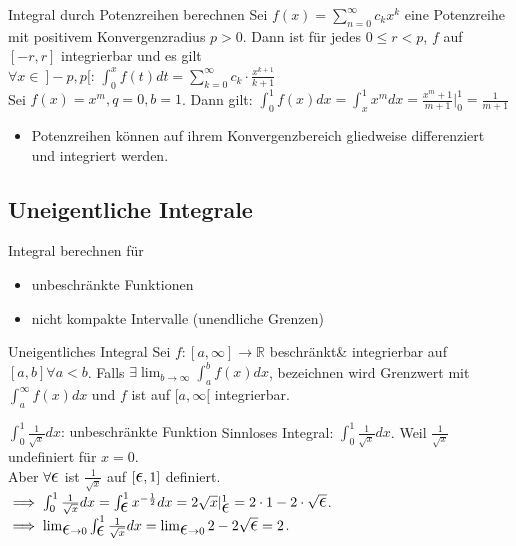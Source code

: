 \documentclass[a4paper]{article}
\let\oldepsilon\epsilon
\renewcommand{\epsilon}{\text{\Large $\oldepsilon$}}
\newcommand\R{\ensuremath{\mathbb{R}}}
\begin{document}
\begin{subbox}{Integral durch Potenzreihen berechnen} 
  Sei $f(x) = \sum_{n=0}^{\infty} c_kx^k$ eine Potenzreihe mit positivem Konvergenzradius $p > 0$. Dann ist für jedes $0 \leq r < p$, $f$ auf $[-r,r]$ integrierbar und es gilt \\
  $\forall x \in \ ]-p,p[$: $\int_0^x f(t) dt = \sum_{k=0}^{\infty} c_k \cdot \frac{x^{k+1}}{k+1}$ \\
  \tiny \color{gray}
    Sei $f(x) = x^m, q = 0, b = 1$. Dann gilt: $\int_{0}^{1}f(x)dx = \int_{x}^{1}x^mdx = \frac{x^m+1}{m+1}|_0^1 = \frac{1}{m+1}$
  \normalsize \color{black}
\end{subbox}
\begin{itemize}[leftmargin=4.5mm, topsep=1pt, parsep=1pt]
  \item Potenzreihen können auf ihrem Konvergenzbereich gliedweise differenziert und integriert werden.
\end{itemize}

\subsection{Uneigentliche Integrale}
Integral berechnen für 
\begin{itemize}[leftmargin=4.5mm, topsep=1pt, parsep=1pt]
  \item unbeschränkte Funktionen 
  \item nicht kompakte Intervalle (unendliche Grenzen)
\end{itemize}

\begin{mainbox}{Uneigentliches Integral}
  Sei $f: [a, \infty] \rightarrow \R$ beschränkt\& integrierbar auf $[a,b] \forall a < b$. 
  Falls $\exists \lim_{b \rightarrow \infty} \int_a^b f(x)dx$, bezeichnen wird Grenzwert mit 
  $ \int_a^\infty f(x)dx$ und $f$ ist auf $[a, \infty[$ integrierbar.
\end{mainbox}

\begin{bspbox}{$\int_{0}^{1} \frac{1}{\sqrt{x}}dx$: unbeschränkte Funktion}
  Sinnloses Integral: $\int_{0}^{1} \frac{1}{\sqrt{x}}dx$. Weil $\frac{1}{\sqrt{x}}$ undefiniert für $x=0$. \\
  Aber $\forall \epsilon$ ist $\frac{1}{\sqrt{x}}$ auf $[\epsilon, 1]$ definiert. \\
  $\implies \int_{0}^{1} \frac{1}{\sqrt{x}}dx = \int_{\epsilon}^{1}x^{-\frac{1}{2}}dx = 2 \sqrt{x}|_\epsilon^1 = 2 \cdot 1 - 2 \cdot \sqrt{\epsilon}$. \\
  $\implies \lim_{\epsilon \to 0} \int_{\epsilon}^{1} \frac{1}{\sqrt{x}}dx = \lim_{\epsilon \to 0} 2 - 2\sqrt{\epsilon} = 2$.
\end{bspbox}
\end{document}
